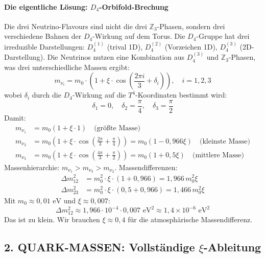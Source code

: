 \documentclass[11pt,a4paper]{article}
\begin{document}
	\paragraph{Die eigentliche Lösung: $D_4$-Orbifold-Brechung}
	Die drei Neutrino-Flavours sind nicht die drei $\mathbb{Z}_3$-Phasen, sondern drei verschiedene Bahnen der $D_4$-Wirkung auf dem Torus. Die $D_4$-Gruppe hat drei irreduzible Darstellungen: $D_4^{(1)}$ (trival 1D), $D_4^{(2)}$ (Vorzeichen 1D), $D_4^{(3)}$ (2D-Darstellung).
	Die Neutrinos nutzen eine Kombination aus $D_4^{(3)}$ und $\mathbb{Z}_3$-Phasen, was drei unterschiedliche Massen ergibt:
	\begin{equation}
		m_{\nu_i} = m_0 \cdot \left(1 + \xi \cdot \cos\left(\frac{2\pi i}{3} + \delta_i\right)\right), \quad i = 1,2,3
	\end{equation}
	wobei $\delta_i$ durch die $D_4$-Wirkung auf die $T^4$-Koordinaten bestimmt wird:
	\begin{equation}
		\delta_1 = 0, \quad \delta_2 = \frac{\pi}{4}, \quad \delta_3 = \frac{\pi}{2}
	\end{equation}
	Damit:
	\begin{align}
		m_{\nu_1} &= m_0(1 + \xi \cdot 1) \quad \text{(größte Masse)} \\
		m_{\nu_2} &= m_0\left(1 + \xi \cdot \cos\left(\frac{2\pi}{3} + \frac{\pi}{4}\right)\right) = m_0(1 - 0{,}966\xi) \quad \text{(kleinste Masse)} \\
		m_{\nu_3} &= m_0\left(1 + \xi \cdot \cos\left(\frac{4\pi}{3} + \frac{\pi}{2}\right)\right) = m_0(1 + 0{,}5\xi) \quad \text{(mittlere Masse)}
	\end{align}
	Massenhierarchie: $m_{\nu_1} > m_{\nu_3} > m_{\nu_2}$.
	Massendifferenzen:
	\begin{align}
		\Delta m^2_{12} &= m_0^2 \cdot \xi \cdot (1 + 0{,}966) = 1{,}966\,m_0^2\xi \\
		\Delta m^2_{23} &= m_0^2 \cdot \xi \cdot (0{,}5 + 0{,}966) = 1{,}466\,m_0^2\xi
	\end{align}
	Mit $m_0 \approx 0{,}01\text{ eV}$ und $\xi \approx 0{,}007$:
	\begin{equation}
		\Delta m^2_{12} \approx 1{,}966 \cdot 10^{-4} \cdot 0{,}007 \text{ eV}^2 \approx 1{,}4 \times 10^{-6}\text{ eV}^2
	\end{equation}
	Das ist zu klein. Wir brauchen $\xi \approx 0{,}4$ für die atmosphärische Massendifferenz.
	
	\subsection{2. QUARK-MASSEN: Vollständige \texorpdfstring{$\xi$}{xi}-Ableitung}
\end{document}

